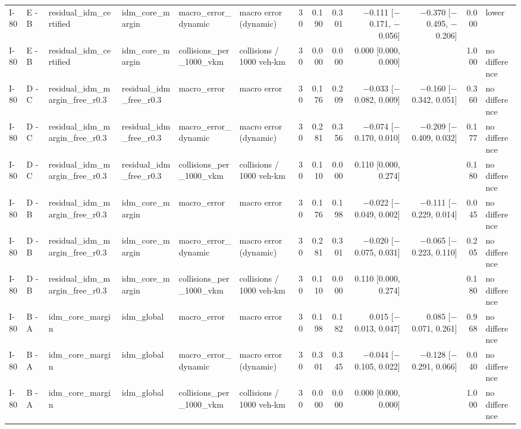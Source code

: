 \begin{table}[htbp]
{\begin{tabular}{llllllrrrrrrl}
I-80 & E - B & residual\_idm\_certified & idm\_core\_margin & macro\_error\_dynamic & macro error (dynamic) & 30 & 0.190 & 0.301 & $-$0.111 [$-$0.171, $-$0.056] & $-$0.370 [$-$0.495, $-$0.206] & 0.000 & lower \\
I-80 & E - B & residual\_idm\_certified & idm\_core\_margin & collisions\_per\_1000\_vkm & collisions / 1000 veh-km & 30 & 0.000 & 0.000 & 0.000 [0.000, 0.000] &  & 1.000 & no difference \\
I-80 & D - C & residual\_idm\_margin\_free\_r0.3 & residual\_idm\_free\_r0.3 & macro\_error & macro error & 30 & 0.176 & 0.209 & $-$0.033 [$-$0.082, 0.009] & $-$0.160 [$-$0.342, 0.051] & 0.360 & no difference \\
I-80 & D - C & residual\_idm\_margin\_free\_r0.3 & residual\_idm\_free\_r0.3 & macro\_error\_dynamic & macro error (dynamic) & 30 & 0.281 & 0.356 & $-$0.074 [$-$0.170, 0.010] & $-$0.209 [$-$0.409, 0.032] & 0.177 & no difference \\
I-80 & D - C & residual\_idm\_margin\_free\_r0.3 & residual\_idm\_free\_r0.3 & collisions\_per\_1000\_vkm & collisions / 1000 veh-km & 30 & 0.110 & 0.000 & 0.110 [0.000, 0.274] &  & 0.180 & no difference \\
I-80 & D - B & residual\_idm\_margin\_free\_r0.3 & idm\_core\_margin & macro\_error & macro error & 30 & 0.176 & 0.198 & $-$0.022 [$-$0.049, 0.002] & $-$0.111 [$-$0.229, 0.014] & 0.045 & no difference \\
I-80 & D - B & residual\_idm\_margin\_free\_r0.3 & idm\_core\_margin & macro\_error\_dynamic & macro error (dynamic) & 30 & 0.281 & 0.301 & $-$0.020 [$-$0.075, 0.031] & $-$0.065 [$-$0.223, 0.110] & 0.205 & no difference \\
I-80 & D - B & residual\_idm\_margin\_free\_r0.3 & idm\_core\_margin & collisions\_per\_1000\_vkm & collisions / 1000 veh-km & 30 & 0.110 & 0.000 & 0.110 [0.000, 0.274] &  & 0.180 & no difference \\
I-80 & B - A & idm\_core\_margin & idm\_global & macro\_error & macro error & 30 & 0.198 & 0.182 & 0.015 [$-$0.013, 0.047] & 0.085 [$-$0.071, 0.261] & 0.968 & no difference \\
I-80 & B - A & idm\_core\_margin & idm\_global & macro\_error\_dynamic & macro error (dynamic) & 30 & 0.301 & 0.345 & $-$0.044 [$-$0.105, 0.022] & $-$0.128 [$-$0.291, 0.066] & 0.040 & no difference \\
I-80 & B - A & idm\_core\_margin & idm\_global & collisions\_per\_1000\_vkm & collisions / 1000 veh-km & 30 & 0.000 & 0.000 & 0.000 [0.000, 0.000] &  & 1.000 & no difference \\

\end{tabular}}
\end{table}
